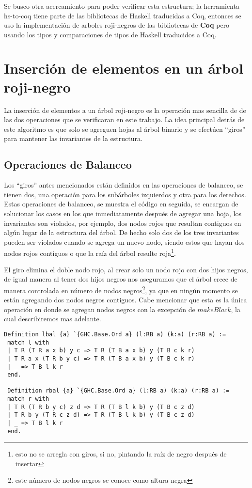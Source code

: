 \documentclass[letterpaper,12pt,oneside]{book}
\newcommand{\coq}{\textbf{Coq}}
\newcommand{\arn}{árbol roji-negro}
\newcommand{\arns}{arboles roji-negros}
\theoremstyle{plain}
\theoremstyle{definition}
\theoremstyle{remark}
\begin{document}
Se busco otra acercamiento para poder verificar esta estructura; la herramienta hs-to-coq tiene parte de 
las bibliotecas de Haskell traducidas a Coq, entonces se uso la implementación de {\arns} de las 
bibliotecas de {\coq}\cite{MSetRBT} pero usando los tipos y comparaciones de tipos de Haskell traducidos 
a Coq.

\section{Inserción de elementos en un {{{\arn}}}}

La inserci\'on de elementos a un {{{\arn}}} es la operaci\'on mas sencilla de de las dos operaciones que 
se verificaran en este trabajo. La idea principal detrás de este algoritmo es que solo se agreguen hojas 
al \'arbol binario y se efectúen ``giros'' para mantener las invariantes de la estructura.

\subsection{Operaciones de Balanceo}
Los ``giros'' antes mencionados están definidos en las operaciones de balanceo, se tienen dos, una 
operaci\'on para los subárboles izquierdos y otra para los derechos. Estas operaciones de balanceo, se 
muestra el c\'odigo en seguida, se encargan de solucionar los casos en los que inmediatamente después de 
agregar una hoja, los invariantes son violados, por ejemplo, dos nodos rojos que resultan contiguos en 
algún lugar de la estructura del \'arbol. De hecho solo dos de los tres invariantes pueden ser violados 
cuando se agrega un nuevo nodo, siendo estos que hayan dos nodos rojos contiguos o que la raíz del árbol 
resulte roja\footnote{esto no se arregla con giros, si no, pintando la raíz de negro después de 
insertar}.

El giro elimina el doble nodo rojo, al crear solo un nodo rojo con dos hijos negros, de igual manera al 
tener dos hijos negros nos aseguramos que el árbol crece de manera controlada en n\'umero de nodos 
negros\footnote{este n\'umero de nodos negros se conoce como altura negra}, ya que en ningún momento se 
están agregando dos nodos negros contiguos. Cabe mencionar que esta es la única operación en donde se 
agregan nodos negros con la excepción de $makeBlack$, la cual describiremos mas adelante.

\begin{verbatim}
Definition lbal {a} `{GHC.Base.Ord a} (l:RB a) (k:a) (r:RB a) :=
 match l with
 | T R (T R a x b) y c => T R (T B a x b) y (T B c k r)
 | T R a x (T R b y c) => T R (T B a x b) y (T B c k r)
 | _ => T B l k r
 end.

 Definition rbal {a} `{GHC.Base.Ord a} (l:RB a) (k:a) (r:RB a) :=
 match r with
 | T R (T R b y c) z d => T R (T B l k b) y (T B c z d)
 | T R b y (T R c z d) => T R (T B l k b) y (T B c z d)
 | _ => T B l k r
 end.
\end{verbatim}
\end{document}

